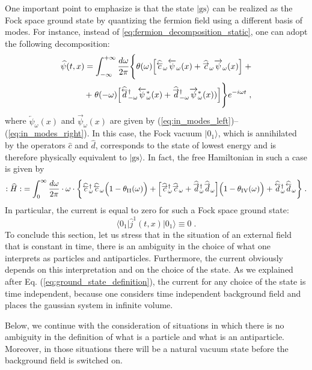 \documentclass[12pt]{article}
\newcommand\beq{\begin{equation}}
\newcommand\eeq{\end{equation}}
\def\psiwR{\overrightarrow{\psi}_{\omega}}
\def\psiwL{\overleftarrow{\psi}_{\omega}}
\def\w{\omega}
\def\II{\mathrm{II}}
\def\IV{\mathrm{IV}}
\def\hatcL{\widehat{ \overset{\smash{\raisebox{-0.45ex}{$\scriptstyle\leftarrow$}}}{c} }}
\def\hatdL{\widehat{ \overset{\smash{\raisebox{-0.5ex}{$\scriptstyle\leftarrow$}}}{d} }}
\def\hatcR{\widehat{ \overset{\smash{\raisebox{-0.45ex}{$\scriptstyle\rightarrow$}}}{c} }}
\def\hatdR{\widehat{ \overset{\smash{\raisebox{-0.5ex}{$\scriptstyle\rightarrow$}}}{d} }}
\numberwithin{equation}{section}
\begin{document}
One important point to emphasize is that the state $\Big|\text{gs}\Big\rangle$ can be realized as the Fock space ground state by quantizing the fermion field using a different basis of modes. For instance, instead of \eqref{eq:fermion_decomposition_static}, one can adopt the following decomposition:
\beq
\begin{aligned}
\label{eq:alternative_fermion_decomposition}
    \widehat{\psi}(t,x) = \int_{-\infty}^{+\infty}\frac{d\omega}{2\pi}\Bigg\{\theta(\w)\Big[\hatcL_{\w}\psiwL(x) + \hatcR_{\w}\psiwR(x)\Big]\; + 
    \\
    +\;\theta(-\w)\Big[\hatdL\phantom{\empty}^{\dagger}_{-\w}\psiwL^*(x) +\hatdR\phantom{\empty}^{\dagger}_{-\w}\psiwR^*(x))\Big]\Bigg\}e^{-i\w t}\;,
\end{aligned}
\eeq
where $\psiwL(x)$ and $\psiwR(x)$ are given by (\ref{eq:in_modes_left})–(\ref{eq:in_modes_right}). In this case, the Fock vacuum $\Big|0_1\Big\rangle$, which is annihilated by the operators $\widehat{c}$ and $\widehat{d}$, corresponds to the state of lowest energy and is therefore physically equivalent to $\Big|\text{gs}\Big\rangle$. In fact, the free Hamiltonian in such a case is given by
\beq\label{eq:free_Hamiltonian_alternative}
\begin{aligned}
    :\widehat{H}: \;=
    \int_{0}^{\infty}\frac{d\w}{2\pi}\cdot\w\cdot\bigg\{\hatcL\phantom{\empty}^{\dagger}_{\w}\hatcL_{\w}\Big(1-\theta_{\II}(\w)\Big) + \Big[\hatcR\phantom{\empty}^{\dagger}_{\w}\hatcR_{\w}  + \hatdR\phantom{\empty}^{\dagger}_{\w}\hatdR_{\w}\Big]\Big(1-\theta_{\IV}(\w)\Big)+\hatdL\phantom{\empty}^{\dagger}_{\w}\hatdL_{\w}  \bigg\}\;.
\end{aligned}
\eeq
In particular, the current is equal to zero for such a Fock space ground state:
\beq\label{eq:const_field_alternative_fock_current}
\boxed{
\Big\langle 0_1 \Big|\widehat{j}^1(t,x)\Big| 0_1 \Big\rangle \equiv 0\;.}
\eeq
To conclude this section, let us stress that in the situation of an external field that is constant in time, there is an ambiguity in the choice of what one interprets as particles and antiparticles. Furthermore, the current obviously depends on this interpretation and on the choice of the state. As we explained after Eq. (\ref{eq:ground_state_definition}), the current for any choice of the state is time independent, because one considers time independent background field and places the gaussian system in infinite volume.

Below, we continue with the consideration of situations in which there is no ambiguity in the definition of what is a particle and what is an antiparticle. Moreover, in those situations there will be a natural vacuum state before the background field is switched on.
\end{document}
